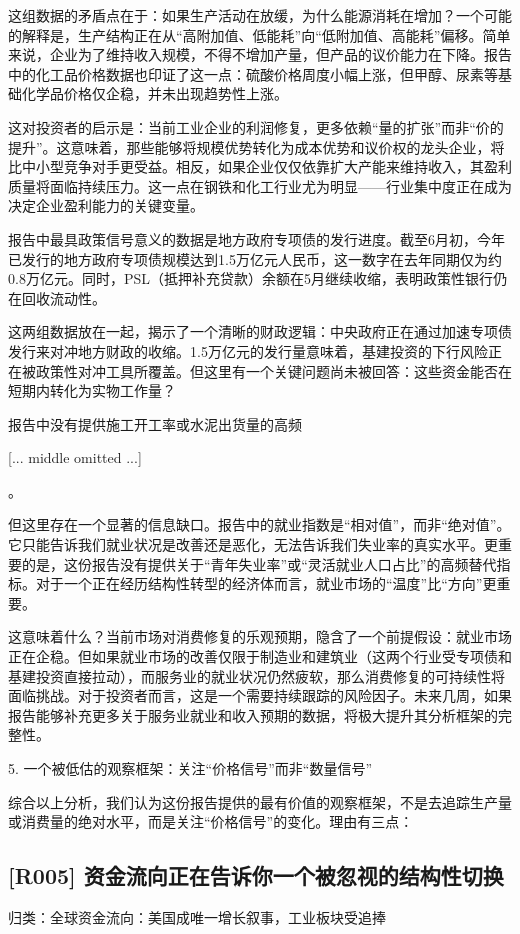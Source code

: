\documentclass[11pt]{ctexart}
\begin{document}
这组数据的矛盾点在于：如果生产活动在放缓，为什么能源消耗在增加？一个可能的解释是，生产结构正在从“高附加值、低能耗”向“低附加值、高能耗”偏移。简单来说，企业为了维持收入规模，不得不增加产量，但产品的议价能力在下降。报告中的化工品价格数据也印证了这一点：硫酸价格周度小幅上涨，但甲醇、尿素等基础化学品价格仅企稳，并未出现趋势性上涨。

这对投资者的启示是：当前工业企业的利润修复，更多依赖“量的扩张”而非“价的提升”。这意味着，那些能够将规模优势转化为成本优势和议价权的龙头企业，将比中小型竞争对手更受益。相反，如果企业仅仅依靠扩大产能来维持收入，其盈利质量将面临持续压力。这一点在钢铁和化工行业尤为明显——行业集中度正在成为决定企业盈利能力的关键变量。

报告中最具政策信号意义的数据是地方政府专项债的发行进度。截至6月初，今年已发行的地方政府专项债规模达到1.5万亿元人民币，这一数字在去年同期仅为约0.8万亿元。同时，PSL（抵押补充贷款）余额在5月继续收缩，表明政策性银行仍在回收流动性。

这两组数据放在一起，揭示了一个清晰的财政逻辑：中央政府正在通过加速专项债发行来对冲地方财政的收缩。1.5万亿元的发行量意味着，基建投资的下行风险正在被政策性对冲工具所覆盖。但这里有一个关键问题尚未被回答：这些资金能否在短期内转化为实物工作量？

报告中没有提供施工开工率或水泥出货量的高频

[... middle omitted ...]

。

但这里存在一个显著的信息缺口。报告中的就业指数是“相对值”，而非“绝对值”。它只能告诉我们就业状况是改善还是恶化，无法告诉我们失业率的真实水平。更重要的是，这份报告没有提供关于“青年失业率”或“灵活就业人口占比”的高频替代指标。对于一个正在经历结构性转型的经济体而言，就业市场的“温度”比“方向”更重要。

这意味着什么？当前市场对消费修复的乐观预期，隐含了一个前提假设：就业市场正在企稳。但如果就业市场的改善仅限于制造业和建筑业（这两个行业受专项债和基建投资直接拉动），而服务业的就业状况仍然疲软，那么消费修复的可持续性将面临挑战。对于投资者而言，这是一个需要持续跟踪的风险因子。未来几周，如果报告能够补充更多关于服务业就业和收入预期的数据，将极大提升其分析框架的完整性。

5. 一个被低估的观察框架：关注“价格信号”而非“数量信号”

综合以上分析，我们认为这份报告提供的最有价值的观察框架，不是去追踪生产量或消费量的绝对水平，而是关注“价格信号”的变化。理由有三点：

\subsection{[R005] 资金流向正在告诉你一个被忽视的结构性切换}
{\small\color{refgray}归类：全球资金流向：美国成唯一增长叙事，工业板块受追捧}
\end{document}
